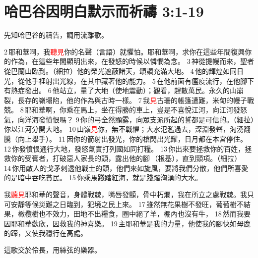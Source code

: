 \section{哈巴谷因明白默示而祈禱 3:1-19}

先知哈巴谷的禱告，調用流離歌。

2 耶和華啊，我\textcolor{red}{聽見}你的名聲（言語）就懼怕。耶和華啊，求你在這些年間復興你的作為，在這些年間顯明出來，在發怒的時候以憐憫為念。 3 神從提幔而來，聖者從巴蘭山臨到。（細拉）他的榮光遮蔽諸天，頌讚充滿大地。 4 他的輝煌如同日光，從他手裡射出光線，在其中藏著他的能力。 5 在他前面有瘟疫流行，在他腳下有熱症發出。 6 他站立，量了大地（使地震動）；觀看，趕散萬民。永久的山崩裂，長存的嶺塌陷，他的作為與古時一樣。 
7 我\textcolor{red}{見}古珊的帳篷遭難，米甸的幔子戰兢。 8 耶和華啊，你乘在馬上，坐在得勝的車上，豈是不喜悅江河，向江河發怒氣，向洋海發憤恨嗎？ 9 你的弓全然顯露，向眾支派所起的誓都是可信的。（細拉）你以江河分開大地。 10 山嶺\textcolor{red}{見}你，無不戰懼；大水氾濫過去，深淵發聲，洶湧翻騰（向上舉手）。 11 因你的箭射出發光，你的槍閃出光耀，日月都在本宮停住。 12 你發憤恨通行大地，發怒氣責打列國如同打糧。 13 你出來要拯救你的百姓，拯救你的受膏者，打破惡人家長的頭，露出他的腳 （根基），直到頸項。（細拉） 14 你用敵人的戈矛刺透他戰士的頭，他們來如旋風，要將我們分散，他們所喜愛的是暗中吞吃貧民。 15 你乘馬踐踏紅海，就是踐踏洶湧的大水。

我\textcolor{red}{聽見}耶和華的聲音，身體戰兢，嘴唇發顫，骨中朽爛，我在所立之處戰兢。我只可安靜等候災難之日臨到，犯境之民上來。 17 雖然無花果樹不發旺，葡萄樹不結果，橄欖樹也不效力，田地不出糧食，圈中絕了羊，棚內也沒有牛， 18 然而我要因耶和華歡欣，因救我的神喜樂。 19 主耶和華是我的力量，他使我的腳快如母鹿的蹄，又使我穩行在高處。

這歌交於伶長，用絲弦的樂器。
